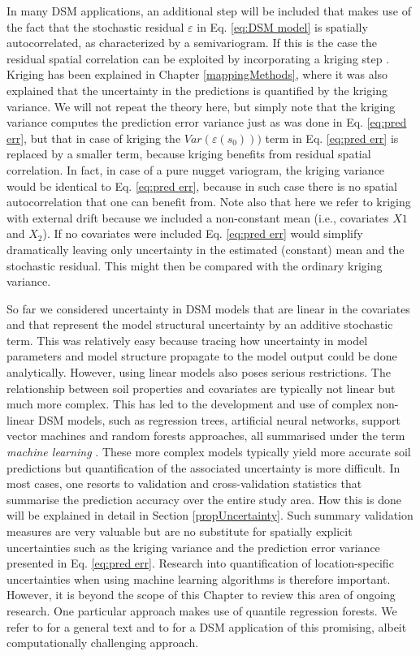 \documentclass[10pt,b5paper,]{book}
\theoremstyle{definition}
\theoremstyle{definition}
\theoremstyle{definition}
\theoremstyle{remark}
\begin{document}
In many DSM applications, an additional step will be included that makes
use of the fact that the stochastic residual \({\varepsilon}\) in Eq.
\ref{eq:DSM model} is spatially autocorrelated, as characterized by a
semivariogram. If this is the case the residual spatial correlation can
be exploited by incorporating a kriging step \citep{hengl2004generic}.
Kriging has been explained in Chapter \ref{mappingMethods}, where it was
also explained that the uncertainty in the predictions is quantified by
the kriging variance. We will not repeat the theory here, but simply
note that the kriging variance computes the prediction error variance
just as was done in Eq. \ref{eq:pred err}, but that in case of kriging
the \({Var(\varepsilon(s_0)))}\) term in Eq. \ref{eq:pred err} is
replaced by a smaller term, because kriging benefits from residual
spatial correlation. In fact, in case of a pure nugget variogram, the
kriging variance would be identical to Eq. \ref{eq:pred err}, because in
such case there is no spatial autocorrelation that one can benefit from.
Note also that here we refer to kriging with external drift because we
included a non-constant mean (i.e., covariates \({X1}\) and \({X_2}\)).
If no covariates were included Eq. \ref{eq:pred err} would simplify
dramatically leaving only uncertainty in the estimated (constant) mean
and the stochastic residual. This might then be compared with the
ordinary kriging variance.

So far we considered uncertainty in DSM models that are linear in the
covariates and that represent the model structural uncertainty by an
additive stochastic term. This was relatively easy because tracing how
uncertainty in model parameters and model structure propagate to the
model output could be done analytically. However, using linear models
also poses serious restrictions. The relationship between soil
properties and covariates are typically not linear but much more
complex. This has led to the development and use of complex non-linear
DSM models, such as regression trees, artificial neural networks,
support vector machines and random forests approaches, all summarised
under the term \emph{machine learning}
\citep[e.g.,][]{hengl2015mapping}. These more complex models typically
yield more accurate soil predictions but quantification of the
associated uncertainty is more difficult. In most cases, one resorts to
validation and cross-validation statistics that summarise the prediction
accuracy over the entire study area. How this is done will be explained
in detail in Section \ref{propUncertainty}. Such summary validation
measures are very valuable but are no substitute for spatially explicit
uncertainties such as the kriging variance and the prediction error
variance presented in Eq. \ref{eq:pred err}. Research into
quantification of location-specific uncertainties when using machine
learning algorithms is therefore important. However, it is beyond the
scope of this Chapter to review this area of ongoing research. One
particular approach makes use of quantile regression forests. We refer
to \cite{meinshausen2006quantile} for a general text and to
\cite{vaysse2017using} for a DSM application of this promising, albeit
computationally challenging approach.
\end{document}
